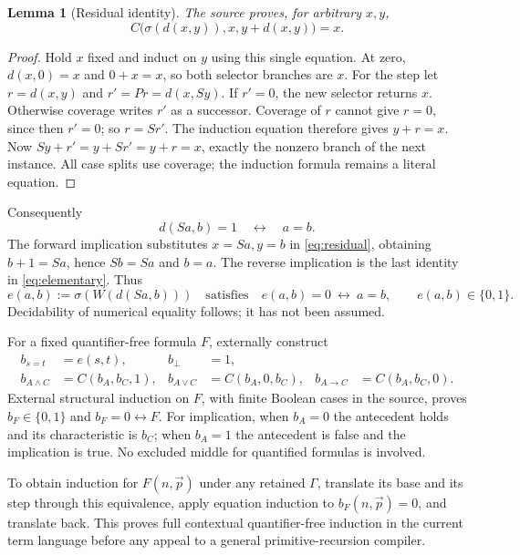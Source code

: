 \documentclass[11pt]{article}
\newtheorem{lemma}[theorem]{Lemma}
\theoremstyle{definition}
\begin{document}
\begin{lemma}[Residual identity]
\label{lem:residual}
The source proves, for arbitrary $x,y$,
\begin{equation}
 C\bigl(\sigma(d(x,y)),x,y+d(x,y)\bigr)=x.
 \label{eq:residual}
\end{equation}
\end{lemma}
\begin{proof}
Hold $x$ fixed and induct on $y$ using this single equation. At zero,
$d(x,0)=x$ and $0+x=x$, so both selector branches are $x$.
For the step let $r=d(x,y)$ and $r'=Pr=d(x,Sy)$. If $r'=0$, the
new selector returns $x$. Otherwise coverage writes $r'$ as a
successor. Coverage of $r$ cannot give $r=0$, since then $r'=0$;
so $r=Sr'$. The induction equation therefore gives $y+r=x$.
Now $Sy+r'=y+Sr'=y+r=x$, exactly the nonzero branch of the next
instance. All case splits use coverage; the induction formula remains
a literal equation.
\end{proof}

Consequently
\begin{equation}
 d(Sa,b)=1\quad\longleftrightarrow\quad a=b.
 \label{eq:residual-reflection}
\end{equation}
The forward implication substitutes $x=Sa,y=b$ in
\eqref{eq:residual}, obtaining $b+1=Sa$, hence $Sb=Sa$ and
$b=a$. The reverse implication is the last identity in
\eqref{eq:elementary}. Thus
\begin{equation}
 e(a,b):=\sigma(W(d(Sa,b)))
 \quad\text{satisfies}\quad
 e(a,b)=0\ \longleftrightarrow\ a=b,
 \qquad e(a,b)\in\{0,1\}.
 \label{eq:e}
\end{equation}
Decidability of numerical equality follows; it has not been assumed.

For a fixed quantifier-free formula $F$, externally construct
\begin{align*}
 b_{s=t}&=e(s,t),& b_\bot&=1,\\
 b_{A\land C}&=C(b_A,b_C,1),&
 b_{A\lor C}&=C(b_A,0,b_C),&
 b_{A\to C}&=C(b_A,b_C,0).
\end{align*}
External structural induction on $F$, with finite Boolean cases in the
source, proves $b_F\in\{0,1\}$ and $b_F=0\leftrightarrow F$.
For implication, when $b_A=0$ the antecedent holds and its characteristic
is $b_C$; when $b_A=1$ the antecedent is false and the implication is
true. No excluded middle for quantified formulas is involved.

To obtain induction for $F(n,\vec p)$ under any retained $\Gamma$,
translate its base and its step through this equivalence, apply
equation induction to $b_F(n,\vec p)=0$, and translate back.
This proves full contextual quantifier-free induction in the current
term language before any appeal to a general primitive-recursion compiler.
\end{document}
